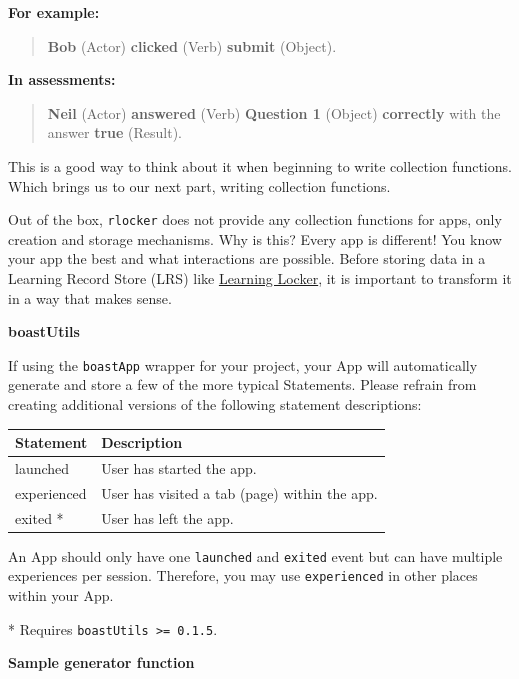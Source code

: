 \documentclass[
]{book}
\begin{document}
\textbf{For example:}

\begin{quote}
\textbf{Bob} (Actor) \textbf{clicked} (Verb) \textbf{submit} (Object).
\end{quote}

\textbf{In assessments:}

\begin{quote}
\textbf{Neil} (Actor) \textbf{answered} (Verb) \textbf{Question 1} (Object) \textbf{correctly} with the answer \textbf{true} (Result).
\end{quote}

This is a good way to think about it when beginning to write collection functions. Which brings us to our next part, writing collection functions.

Out of the box, \texttt{rlocker} does not provide any collection functions for apps, only creation and storage mechanisms. Why is this? Every app is different! You know your app the best and what interactions are possible. Before storing data in a Learning Record Store (LRS) like \href{https://www.ht2labs.com/learning-locker-community/overview/}{Learning Locker}, it is important to transform it in a way that makes sense.

\textbf{boastUtils}

If using the \texttt{boastApp} wrapper for your project, your App will automatically generate and store a few of the more typical Statements. Please refrain from creating additional versions of the following statement descriptions:

\begin{longtable}[]{@{}ll@{}}
\toprule
Statement & Description\tabularnewline
\midrule
\endhead
launched & User has started the app.\tabularnewline
experienced & User has visited a tab (page) within the app.\tabularnewline
exited * & User has left the app.\tabularnewline
\bottomrule
\end{longtable}

An App should only have one \texttt{launched} and \texttt{exited} event but can have multiple experiences per session. Therefore, you may use \texttt{experienced} in other places within your App.

* Requires \texttt{boastUtils\ \textgreater{}=\ 0.1.5}.

\textbf{Sample generator function}
\end{document}
